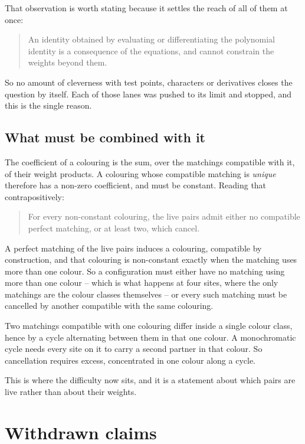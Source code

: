 \documentclass[11pt]{article}
\theoremstyle{definition}
\theoremstyle{remark}
\begin{document}
That observation is worth stating because it settles the reach of all of them at once:

\begin{quote}
An identity obtained by evaluating or differentiating the polynomial identity is a consequence of the
equations, and cannot constrain the weights beyond them.
\end{quote}

So no amount of cleverness with test points, characters or derivatives closes the question by itself.
Each of those lanes was pushed to its limit and stopped, and this is the single reason.

\subsection*{What must be combined with it}

The coefficient of a colouring is the sum, over the matchings compatible with it, of their weight
products.  A colouring whose compatible matching is \emph{unique} therefore has a non-zero
coefficient, and must be constant.  Reading that contrapositively:

\begin{quote}
For every non-constant colouring, the live pairs admit either no compatible perfect matching, or at
least two, which cancel.
\end{quote}

A perfect matching of the live pairs induces a colouring, compatible by construction, and that
colouring is non-constant exactly when the matching uses more than one colour.  So a configuration
must either have no matching using more than one colour -- which is what happens at four sites, where
the only matchings are the colour classes themselves -- or every such matching must be cancelled by
another compatible with the same colouring.

Two matchings compatible with one colouring differ inside a single colour class, hence by a cycle
alternating between them in that one colour.  A monochromatic cycle needs every site on it to carry a
second partner in that colour.  So cancellation requires excess, concentrated in one colour along a
cycle.

This is where the difficulty now sits, and it is a statement about which pairs are live rather than
about their weights.

\section{Withdrawn claims}\label{sec:withdrawn}
\end{document}

